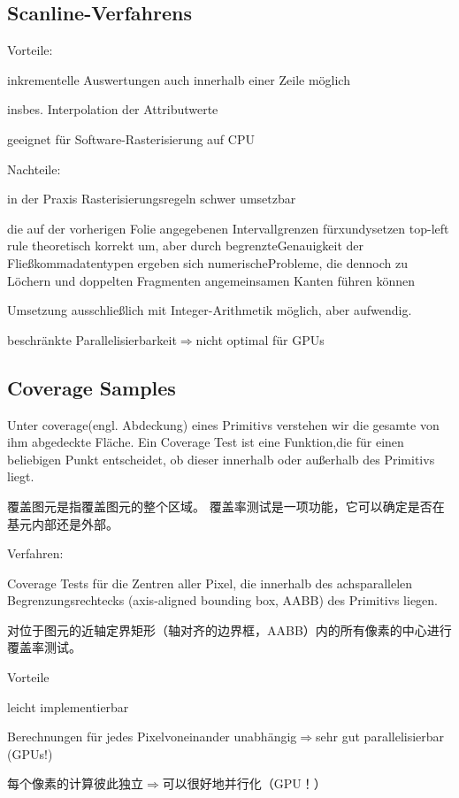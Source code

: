 \documentclass[fleqn]{article}
\begin{document}
\subsection{Scanline-Verfahrens}

\noindent Vorteile:

inkrementelle Auswertungen auch innerhalb einer Zeile möglich

\indent\indent insbes. Interpolation der Attributwerte

geeignet für Software-Rasterisierung auf CPU

\noindent Nachteile:

in der Praxis Rasterisierungsregeln schwer umsetzbar

\indent\indent die auf der vorherigen Folie angegebenen Intervallgrenzen fürxundysetzen top-left rule theoretisch korrekt um, aber durch begrenzteGenauigkeit der Fließkommadatentypen ergeben sich numerischeProbleme, die dennoch zu Löchern und doppelten Fragmenten angemeinsamen Kanten führen können

Umsetzung ausschließlich mit Integer-Arithmetik möglich, aber aufwendig.

beschränkte Parallelisierbarkeit$\Rightarrow$nicht optimal für GPUs

\subsection{Coverage Samples}

Unter coverage(engl. Abdeckung) eines Primitivs verstehen wir die gesamte von ihm abgedeckte Fläche. Ein Coverage Test ist eine Funktion,die für einen beliebigen Punkt entscheidet, ob dieser innerhalb oder außerhalb des Primitivs liegt.

覆盖图元是指覆盖图元的整个区域。 覆盖率测试是一项功能，它可以确定是否在基元内部还是外部。

\noindent Verfahren:

Coverage Tests für die Zentren aller Pixel, die innerhalb des achsparallelen Begrenzungsrechtecks (axis-aligned bounding box, AABB) des Primitivs liegen.

对位于图元的近轴定界矩形（轴对齐的边界框，AABB）内的所有像素的中心进行覆盖率测试。

\noindent Vorteile

leicht implementierbar

Berechnungen für jedes Pixelvoneinander unabhängig$\Rightarrow$sehr gut parallelisierbar (GPUs!)

每个像素的计算彼此独立$ \Rightarrow $可以很好地并行化（GPU！）
\end{document}
